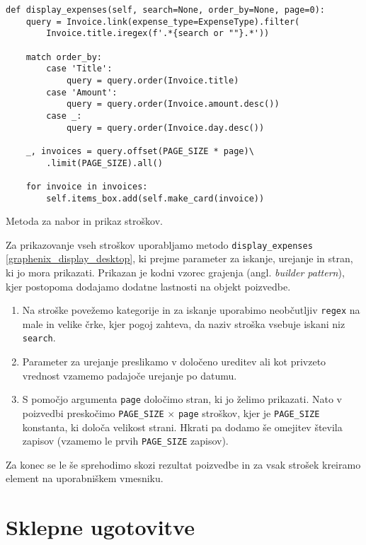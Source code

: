 \documentclass[a4paper,12pt,openright]{book}
\begin{document}
\begin{code}
\begin{verbatim}
def display_expenses(self, search=None, order_by=None, page=0):
    query = Invoice.link(expense_type=ExpenseType).filter(
        Invoice.title.iregex(f'.*{search or ""}.*'))

    match order_by:
        case 'Title':
            query = query.order(Invoice.title)
        case 'Amount':
            query = query.order(Invoice.amount.desc())
        case _:
            query = query.order(Invoice.day.desc())
    
    _, invoices = query.offset(PAGE_SIZE * page)\
        .limit(PAGE_SIZE).all()
    
    for invoice in invoices:
        self.items_box.add(self.make_card(invoice))
\end{verbatim}
\caption{Metoda za nabor in prikaz stroškov.}
\label{graphenix_display_desktop}
\end{code}

    \noindent
    Za prikazovanje vseh stroškov uporabljamo metodo {\tt display\_expenses} \ref{graphenix_display_desktop}, ki prejme parameter za iskanje, urejanje in stran, ki jo mora prikazati. Prikazan je kodni vzorec grajenja (angl. \textit{builder pattern}), kjer postopoma dodajamo dodatne lastnosti na objekt poizvedbe. 
    \begin{enumerate}
        \item Na stroške povežemo kategorije in za iskanje uporabimo neobčutljiv {\tt regex} na male in velike črke, kjer pogoj zahteva, da naziv stroška vsebuje iskani niz {\tt search}.
        \item Parameter za urejanje preslikamo v določeno ureditev ali kot privzeto vrednost vzamemo padajoče urejanje po datumu.
        \item S pomočjo argumenta {\tt page} določimo stran, ki jo želimo prikazati. Nato v poizvedbi preskočimo {\tt PAGE\_SIZE} $\times$ {\tt page} stroškov, kjer je {\tt PAGE\_SIZE} konstanta, ki določa velikost strani. Hkrati pa dodamo še omejitev števila zapisov (vzamemo le prvih {\tt PAGE\_SIZE} zapisov).
    \end{enumerate}

    \noindent
    Za konec se le še sprehodimo skozi rezultat poizvedbe in za vsak strošek kreiramo element na uporabniškem vmesniku.
    

\chapter{Sklepne ugotovitve}
    
\end{document}
